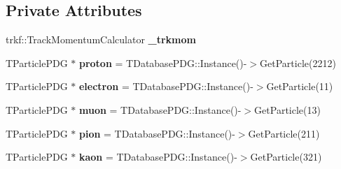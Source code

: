 \subsection*{Private Attributes}
\begin{DoxyCompactItemize}
\item 
\hypertarget{classselection_1_1NuMuSelection_a185927f3dc298ec0b8296be2c8648141}{trkf\-::\-Track\-Momentum\-Calculator {\bfseries \-\_\-trkmom}}\label{classselection_1_1NuMuSelection_a185927f3dc298ec0b8296be2c8648141}

\item 
\hypertarget{classselection_1_1NuMuSelection_ab8e07cbd8525b836dab50d64763601f9}{T\-Particle\-P\-D\-G $\ast$ {\bfseries proton} = T\-Database\-P\-D\-G\-::\-Instance()-\/$>$Get\-Particle(2212)}\label{classselection_1_1NuMuSelection_ab8e07cbd8525b836dab50d64763601f9}

\item 
\hypertarget{classselection_1_1NuMuSelection_a5ba2d705b86b01d5dc3e81bef4c7f529}{T\-Particle\-P\-D\-G $\ast$ {\bfseries electron} = T\-Database\-P\-D\-G\-::\-Instance()-\/$>$Get\-Particle(11)}\label{classselection_1_1NuMuSelection_a5ba2d705b86b01d5dc3e81bef4c7f529}

\item 
\hypertarget{classselection_1_1NuMuSelection_a3febed51a71a8cdb52ef098c7ceaccf3}{T\-Particle\-P\-D\-G $\ast$ {\bfseries muon} = T\-Database\-P\-D\-G\-::\-Instance()-\/$>$Get\-Particle(13)}\label{classselection_1_1NuMuSelection_a3febed51a71a8cdb52ef098c7ceaccf3}

\item 
\hypertarget{classselection_1_1NuMuSelection_ad69c6385b7bdb99a3a85bc9d48555ca7}{T\-Particle\-P\-D\-G $\ast$ {\bfseries pion} = T\-Database\-P\-D\-G\-::\-Instance()-\/$>$Get\-Particle(211)}\label{classselection_1_1NuMuSelection_ad69c6385b7bdb99a3a85bc9d48555ca7}

\item 
\hypertarget{classselection_1_1NuMuSelection_ab5f0dc22ab81c743cbb880c048901f75}{T\-Particle\-P\-D\-G $\ast$ {\bfseries kaon} = T\-Database\-P\-D\-G\-::\-Instance()-\/$>$Get\-Particle(321)}\label{classselection_1_1NuMuSelection_ab5f0dc22ab81c743cbb880c048901f75}


\end{DoxyCompactItemize}
